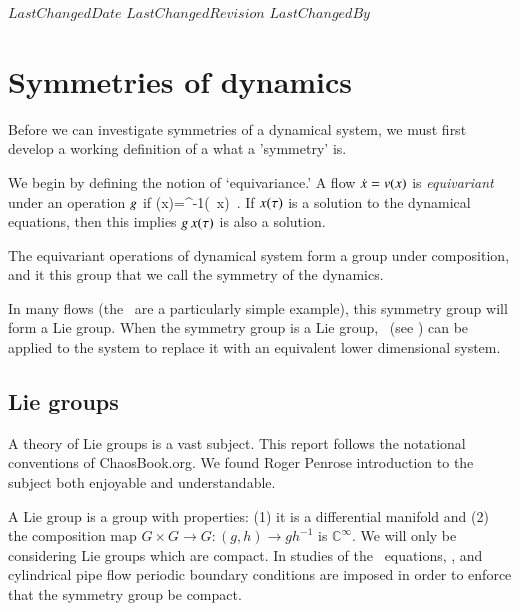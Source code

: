 
{$LastChangedDate$}
{$LastChangedRevision$} {$LastChangedBy$}


\section{Symmetries of dynamics}
\label{sect:SymmDyn}

Before we can investigate symmetries of a dynamical system, we must first develop a working definition of a what a 'symmetry' is.

We begin by defining the notion of `equivariance.'
A flow $\dot{x}= v(x)$ is \emph{equivariant} under an operation $g$ if
\beq
\vel(x)=\LieEl^{-1}\vel(\LieEl \, x)
\,.
If $x(\tau)$ is a solution to the dynamical
equations, then this implies $g\,x(\tau)$ is also a solution.

The equivariant operations of dynamical system form a group under composition, and it this group that we call the symmetry of the dynamics.

In many flows (the \cLe\ are a particularly simple example), this symmetry group will form a Lie group. When the symmetry group is a Lie group, \mslices\ (see ) can be applied to the system to replace it with an equivalent lower dimensional system.


\subsection{Lie groups}

A theory of Lie groups is a vast subject. This report follows the
notational conventions of ChaosBook.org. We found Roger
Penrose introduction to the subject both enjoyable and
understandable.
	\inCB

A Lie group is a group with properties: (1) it is a differential manifold and (2) the composition map $G \times G \rightarrow G : (g,h) \rightarrow g h^{-1}$ is $\mathbb{C}^\infty$. We will only be considering Lie groups which are compact.
In studies of the \KS\ equations, {\pCf}, and cylindrical pipe flow periodic boundary conditions are imposed in  order to enforce that the symmetry group be compact.

